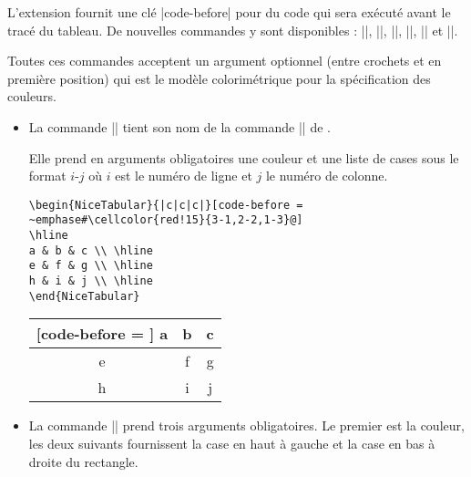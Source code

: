 \documentclass[dvipsnames]{article}%
\begin{document}
\medskip
L'extension  fournit une clé |code-before| pour du code qui sera
exécuté avant le tracé du tableau. De nouvelles commandes y sont disponibles :
|\cellcolor|, |\rectanglecolor|, |\rowcolor|, |\columncolor|, |\rowcolors| et
|\chessboardcolors|.
\label{code-before}

\medskip
Toutes ces commandes acceptent un argument optionnel (entre crochets et en
première position) qui est le modèle colorimétrique pour la spécification des
couleurs.

\medskip
\begin{itemize}
\item La commande |\cellcolor| tient son nom de la commande |\cellcolor| de
.

Elle prend en arguments obligatoires une couleur et une liste de cases sous le
format $i$-$j$ où $i$ est le numéro de ligne et $j$ le numéro de colonne.

\medskip
\begin{scope}
\hfuzz=10cm
\begin{BVerbatim}[boxwidth=10cm,baseline=c]
\begin{NiceTabular}{|c|c|c|}[code-before = ~emphase#\cellcolor{red!15}{3-1,2-2,1-3}@]
\hline
a & b & c \\ \hline
e & f & g \\ \hline
h & i & j \\ \hline
\end{NiceTabular}
\end{BVerbatim}
\begin{NiceTabular}{|c|c|c|}[code-before = ]
\hline
a & b & c \\ \hline
e & f & g \\ \hline
h & i & j \\ \hline
\end{NiceTabular}
\end{scope}

\bigskip
\item La commande |\rectanglecolor| prend trois arguments obligatoires. Le
premier est la couleur, les deux suivants fournissent la case en haut à gauche
et la case en bas à droite du rectangle.


\end{itemize}
\end{document}

